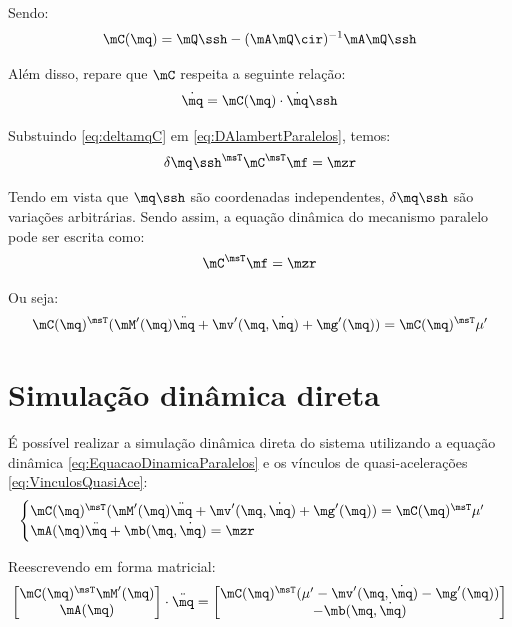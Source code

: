 \documentclass[]{politex}
\begin{document}
Sendo:
\begin{equation} \label{eq:CComplemento}
\mC(\mq) = \mQ\ssh -(\mA \mQ\cir)^{-1} \mA \mQ\ssh 
\end{equation}


Além disso, repare que $\mC$ respeita a seguinte relação:
\begin{equation} \label{eq:CCinematica}
\dot{\mq} = \mC(\mq) \cdot \dot{\mq}\ssh
\end{equation}

Substuindo \eqref{eq:deltamqC} em \eqref{eq:DAlambertParalelos}, temos:
\begin{equation}
\delta {\mq\ssh}^\msT \mC^\msT \mf = \mzr
\end{equation}

Tendo em vista que $\mq\ssh$ são coordenadas independentes, $\delta \mq\ssh$ são variações arbitrárias. Sendo assim, a equação dinâmica do mecanismo paralelo pode ser escrita como:
\begin{equation}
\mC^\msT \mf = \mzr
\end{equation}

Ou seja:
\begin{equation} \label{eq:EquacaoDinamicaParalelos}
\mC(\mq)^\msT (   \mM'(\mq)\ddot{\mq} + \mv'(\mq,\dot{\mq}) + \mg'(\mq) ) = \mC(\mq)^\msT \mu'
\end{equation}

\section{Simulação dinâmica direta} 

É possível realizar a simulação dinâmica direta do sistema utilizando a equação dinâmica \eqref{eq:EquacaoDinamicaParalelos} e os vínculos de quasi-acelerações \eqref{eq:VinculosQuasiAce}:
\begin{equation}
\begin{cases}
\mC(\mq)^\msT (   \mM'(\mq)\ddot{\mq} + \mv'(\mq,\dot{\mq}) + \mg'(\mq) ) = \mC(\mq)^\msT \mu' \\
\mA(\mq)\ddot{\mq} + \mb(\mq,\dot{\mq}) = \mzr
\end{cases}
\end{equation}

Reescrevendo em forma matricial:
\begin{equation}
\begin{bmatrix}
\mC(\mq)^\msT \mM'(\mq) \\
\mA(\mq)
\end{bmatrix}
\cdot
\ddot{\mq}
=
\begin{bmatrix}
\mC(\mq)^\msT (\mu' - \mv'(\mq,\dot{\mq}) - \mg'(\mq) ) \\
-\mb(\mq,\dot{\mq})
\end{bmatrix}
\end{equation}
\end{document}
